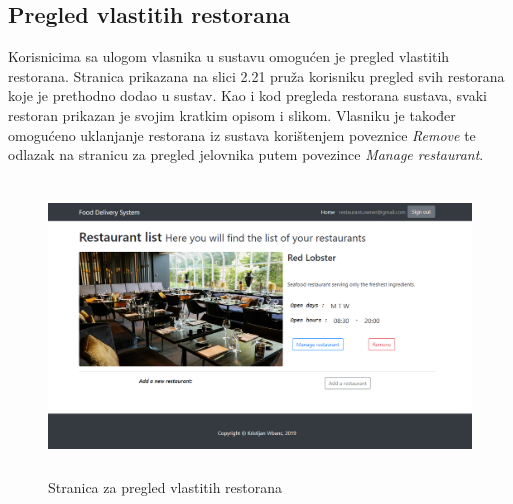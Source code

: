 \documentclass[times, utf8, zavrsni, numeric]{fer}
\begin{document}
\subsection{Pregled vlastitih restorana}
Korisnicima sa ulogom vlasnika u sustavu omogućen je pregled vlastitih restorana. Stranica prikazana na slici 2.21 pruža korisniku pregled  svih restorana koje je prethodno dodao u sustav. Kao i kod pregleda restorana sustava, svaki restoran prikazan je svojim kratkim opisom i slikom. Vlasniku je također omogućeno uklanjanje restorana iz sustava korištenjem poveznice \emph{Remove} te odlazak na stranicu za pregled jelovnika putem povezince \emph{Manage restaurant}.
\begin{figure}[htb]
\centering
\includegraphics[height=7.8cm]{myrestaurants.png}
\caption{Stranica za pregled vlastitih restorana}
\label{fig:myRest}
\end{figure}
\end{document}
